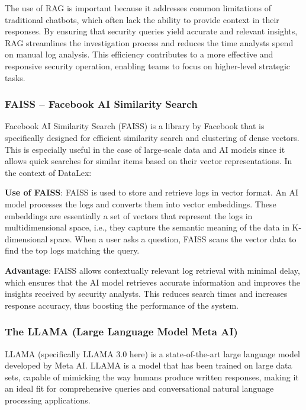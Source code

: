 The use of RAG is important because it addresses common limitations of traditional chatbots, which often lack the ability to provide context in their responses. By ensuring that security queries yield accurate and relevant insights, RAG streamlines the investigation process and reduces the time analysts spend on manual log analysis. This efficiency contributes to a more effective and responsive security operation, enabling teams to focus on higher-level strategic tasks.

\subsubsection{FAISS -- Facebook AI Similarity Search}
\label{subsubsec_faiss}

Facebook AI Similarity Search (FAISS) is a library by Facebook that is specifically designed for efficient similarity search and clustering of dense vectors. This is especially useful in the case of large-scale data and AI models since it allows quick searches for similar items based on their vector representations. In the context of DataLex:

\textbf{Use of FAISS}: FAISS is used to store and retrieve logs in vector format. An AI model processes the logs and converts them into vector embeddings. These embeddings are essentially a set of vectors that represent the logs in multidimensional space, i.e., they capture the semantic meaning of the data in K-dimensional space. When a user asks a question, FAISS scans the vector data to find the top logs matching the query.

\textbf{Advantage}: FAISS allows contextually relevant log retrieval with minimal delay, which ensures that the AI model retrieves accurate information and improves the insights received by security analysts. This reduces search times and increases response accuracy, thus boosting the performance of the system.

\subsubsection{The LLAMA (Large Language Model Meta AI)}
\label{subsubsec_llama}

LLAMA (specifically LLAMA 3.0 here) is a state-of-the-art large language model developed by Meta AI. LLAMA is a model that has been trained on large data sets, capable of mimicking the way humans produce written responses, making it an ideal fit for comprehensive queries and conversational natural language processing applications.

